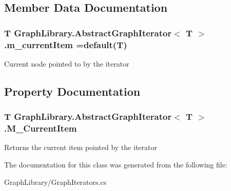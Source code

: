 \subsection{Member Data Documentation}
\hypertarget{class_graph_library_1_1_abstract_graph_iterator_a147d69602d7366f2a22b97243382141b}{}
\subsubsection[{m\+\_\+current\+Item}]{\setlength{\rightskip}{0pt plus 5cm}T {\bf Graph\+Library.\+Abstract\+Graph\+Iterator}$<$ T $>$.m\+\_\+current\+Item =default(T)\hspace{0.3cm}{\ttfamily [protected]}}\label{class_graph_library_1_1_abstract_graph_iterator_a147d69602d7366f2a22b97243382141b}


Current node pointed to by the iterator 



\subsection{Property Documentation}
\hypertarget{class_graph_library_1_1_abstract_graph_iterator_ac5ae9844333f785e03b34ee18e59096a}{}
\subsubsection[{M\+\_\+\+Current\+Item}]{\setlength{\rightskip}{0pt plus 5cm}T {\bf Graph\+Library.\+Abstract\+Graph\+Iterator}$<$ T $>$.M\+\_\+\+Current\+Item\hspace{0.3cm}{\ttfamily [get]}}\label{class_graph_library_1_1_abstract_graph_iterator_ac5ae9844333f785e03b34ee18e59096a}


Returns the current item pointed by the iterator 



The documentation for this class was generated from the following file\+:\begin{DoxyCompactItemize}
\item 
Graph\+Library/Graph\+Iterators.\+cs\end{DoxyCompactItemize}

